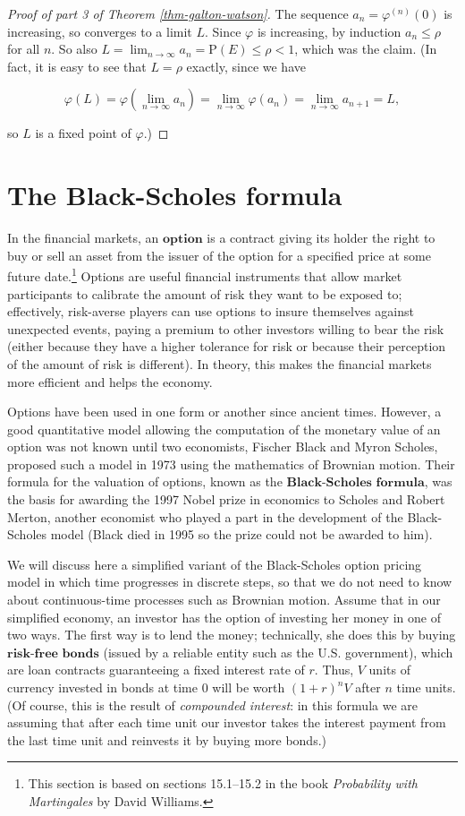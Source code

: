 \begin{proof}[Proof of part 3 of Theorem \ref{thm-galton-watson}]
The sequence $a_n = \varphi^{(n)}(0)$ is increasing,
so converges to a limit $L$. Since $\varphi$ is
increasing, by induction $a_n\le \rho$ for all $n$.
So also
$L=\lim_{n\to\infty} a_n = \mathrm{P}(E) \le \rho <1$,
which was the claim. (In fact, it is easy to see that
$L=\rho$ exactly, since we have

\[
\varphi(L)=\varphi(\lim_{n\to\infty} a_n) = \lim_{n\to\infty} \varphi(a_n) = \lim_{n\to\infty} a_{n+1} = L,
\]

\noindent so $L$ is a fixed point of $\varphi$.)
\end{proof}

\section{The Black-Scholes formula}
In the financial markets, an $\textbf{option}$ is a
contract giving its holder the right to buy or sell an
asset from the issuer of the option for a specified
price at some future date.\footnote{This section is based on sections 15.1--15.2 in the
book \emph{Probability with Martingales} by David Williams.}
Options are useful financial instruments that allow
market participants to calibrate the amount of risk
they want to be exposed to; effectively, risk-averse
players can use options to insure themselves against
unexpected events, paying a premium to other investors
willing to bear the risk (either because they have a
higher tolerance for risk or because their perception
of the amount of risk is different). In theory, this
makes the financial markets more efficient and helps
the economy.

Options have been used in one form or another since
ancient times. However, a good quantitative model
allowing the computation of the monetary value of an
option was not known until two economists, Fischer
Black and Myron Scholes, proposed such a model in 1973
using the mathematics of Brownian motion. Their
formula for the valuation of options, known as the
$\textbf{Black-Scholes formula}$, was the basis for
awarding the 1997 Nobel prize in economics to Scholes
and Robert Merton, another economist who played a part
in the development of the Black-Scholes model (Black
died in 1995 so the prize could not be awarded to
him).

We will discuss here a simplified variant of the
Black-Scholes option pricing model in which time
progresses in discrete steps, so that we do not need
to know about continuous-time processes such as
Brownian motion. Assume that in our simplified
economy, an investor has the option of investing her
money in one of two ways. The first way is to lend the
money; technically, she does this by buying
$\textbf{risk-free bonds}$ (issued by a reliable
entity such as the U.S. government), which are loan
contracts guaranteeing a fixed interest rate of $r$.
Thus, $V$ units of currency invested in bonds at time
$0$ will be worth $(1+r)^n V$ after $n$ time units.
(Of course, this is the result of \emph{compounded
interest}: in this formula we are assuming that after
each time unit our investor takes the interest payment
from the last time unit and reinvests it by buying
more bonds.)

